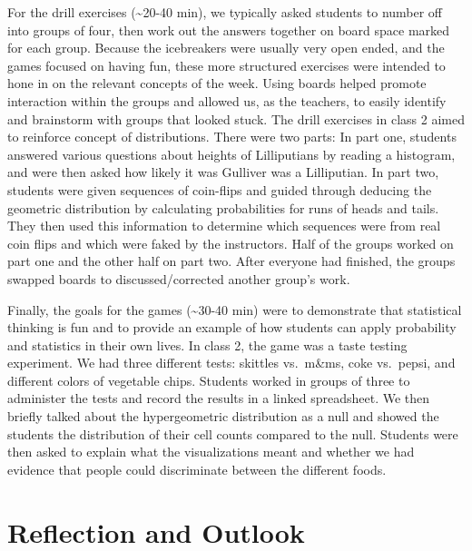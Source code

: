 \documentclass[12pt,twoside]{mitthesis-manusdown}
\begin{document}
For the drill exercises (\textasciitilde{}20-40 min), we typically asked
students to number off into groups of four, then work out the answers
together on board space marked for each group. Because the icebreakers
were usually very open ended, and the games focused on having fun, these
more structured exercises were intended to hone in on the relevant
concepts of the week. Using boards helped promote interaction within the
groups and allowed us, as the teachers, to easily identify and
brainstorm with groups that looked stuck. The drill exercises in class 2
aimed to reinforce concept of distributions. There were two parts: In
part one, students answered various questions about heights of
Lilliputians by reading a histogram, and were then asked how likely it
was Gulliver was a Lilliputian. In part two, students were given
sequences of coin-flips and guided through deducing the geometric
distribution by calculating probabilities for runs of heads and tails.
They then used this information to determine which sequences were from
real coin flips and which were faked by the instructors. Half of the
groups worked on part one and the other half on part two. After everyone
had finished, the groups swapped boards to discussed/corrected another
group's work.

Finally, the goals for the games (\textasciitilde{}30-40 min) were to
demonstrate that statistical thinking is fun and to provide an example
of how students can apply probability and statistics in their own lives.
In class 2, the game was a taste testing experiment. We had three
different tests: skittles vs.~m\&ms, coke vs.~pepsi, and different
colors of vegetable chips. Students worked in groups of three to
administer the tests and record the results in a linked spreadsheet. We
then briefly talked about the hypergeometric distribution as a null and
showed the students the distribution of their cell counts compared to
the null. Students were then asked to explain what the visualizations
meant and whether we had evidence that people could discriminate between
the different foods.

\section{Reflection and Outlook}\label{reflection-and-outlook}
\end{document}
